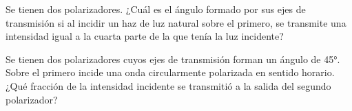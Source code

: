 \item Se tienen dos polarizadores.
¿Cuál es el ángulo formado por sus ejes de transmisión si al incidir un haz de luz natural sobre el primero, se transmite una intensidad igual a la cuarta parte de la que tenía la luz incidente?



\item Se tienen dos polarizadores cuyos ejes de transmisión forman un ángulo de \ang{45;;}.
Sobre el primero incide una onda circularmente polarizada en sentido horario.
¿Qué fracción de la intensidad incidente se transmitió a la salida del segundo polarizador?
